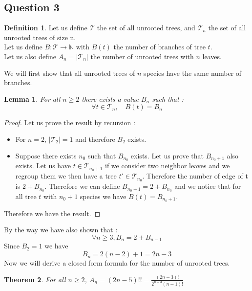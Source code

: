 \documentclass[]{article}
\newtheorem{theorem}{Theorem}[section]
\newtheorem{lemma}[theorem]{Lemma}
\theoremstyle{definition}
\newtheorem{definition}{Definition}[section]
\begin{document}
\subsection{Question 3}
\begin{definition}
	Let us define $\mathcal{T}$ the set of all unrooted trees, and $\mathcal{T}_{n}$ the set of all unrooted trees of size n.\\
	Let us define $B : \mathcal{T} \rightarrow \mathbb{N}$ with $B(t)$ the number of branches of tree $t$.\\
	Let us also define $A_{n} = |\mathcal{T}_{n}|$ the number of unrooted trees with $n$ leaves.
\end{definition}
We will first show that all unrooted trees of $n$ species have the same number of branches.
\begin{lemma}
	For all $n\geq2$ there exists a value $B_{n}$ such that :\\
	\begin{equation*}
	\forall t \in \mathcal{T}_{n}, \quad B(t) = B_{n}
	\end{equation*}
\end{lemma}
\begin{proof}
	Let us prove the result by recursion :
	\begin{itemize}
	\item For $n = 2$, $|\mathcal{T}_{2}| = 1$ and therefore $B_{2}$ exists.\\
	\item Suppose there exists $n_{0}$ such that $B_{n_{0}}$ exists. Let us prove that $B_{n_{0} + 1}$ also exists.
	Let us have $t \in \mathcal{T}_{n_{0} + 1}$ if we consider two neighbor leaves and we regroup them we then have a tree $t' \in \mathcal{T}_{n_{0}}$. Therefore the number of edge of t is $2 + B_{n_{0}}$. Therefore we can define $B_{n_{0}+1} = 2 +  B_{n_{0}}$ and we notice that for all tree $t$ with $n_{0} + 1$ species we have $B(t) = B_{n_{0} + 1}$.
	\end{itemize}
	Therefore we have the result.
\end{proof}
By the way we have also shown that :
\begin{equation*}
	\forall n \geq 3, B_{n} = 2 + B_{n-1}
\end{equation*}
Since $B_{2} = 1$ we have $$B_{n} = 2(n-2) + 1 = 2n - 3$$
Now we will derive a closed form formula for the number of unrooted trees.
\begin{theorem}
	For all $n\geq 2$, $A_{n} = (2n-5)!! = \frac{(2n-3)!}{2^{n-3}(n-1)!}$
\end{theorem}
\end{document}
